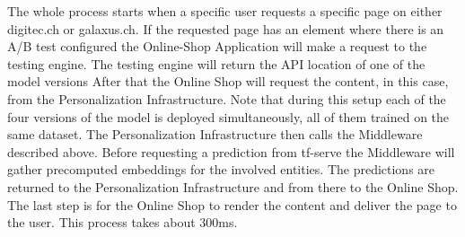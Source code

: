 The whole process starts when a specific user requests a specific page on either digitec.ch or galaxus.ch.
If the requested page has an element where there is an A/B test configured the Online-Shop Application will make a request to the testing engine.
The testing engine will return the API location of one of the model versions
After that the Online Shop will request the content, in this case, from the Personalization Infrastructure.
Note that during this setup each of the four versions of the model is deployed simultaneously, all of them trained on the same dataset.
The Personalization Infrastructure then calls the Middleware described above.
Before requesting a prediction from tf-serve the Middleware will gather precomputed embeddings for the involved entities.
The predictions are returned to the Personalization Infrastructure and from there to the Online Shop.
The last step is for the Online Shop to render the content and deliver the page to the user.
This process takes about 300ms.